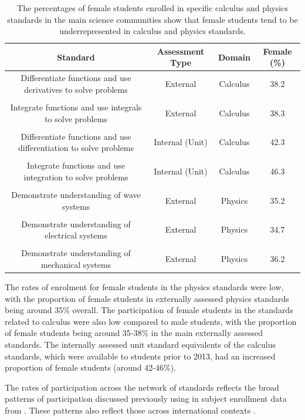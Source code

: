 \begin{table}[ht!]
\begin{tabular}{|c|c|c|c|}
\hline
Standard & Assessment Type & Domain   & Female (\%) \\ \hline
     Differentiate functions and use derivatives to solve problems & External & Calculus & 38.2\\
      & & & \\
     Integrate functions and use integrals to solve problems & External & Calculus & 38.3\\
      & & & \\
     Differentiate functions and use differentiation to solve problems & Internal (Unit) & Calculus  &    42.3   \\
     & & & \\
     Integrate functions and use integration to solve problems & Internal (Unit) & Calculus & 46.3\\
      & & & \\
      Demonstrate understanding of wave systems & External & Physics  &  35.2\\
      & & & \\
     Demonstrate understanding of electrical systems & External & Physics  & 34.7 \\
      & & & \\
      Demonstrate understanding of mechanical systems & External & Physics & 36.2 
      \\ \hline
\end{tabular}  \caption{The percentages of female students enrolled in specific calculus and physics standards in the main science communities show that female students tend to be underrepresented in calculus and physics standards.}  \label{table:StdattainmentGender}

\end{table}

The rates of enrolment for female students in the physics standards were low, with the proportion of female students in externally assessed physics standards being around 35\% overall. The participation of female students in the standards related to calculus were also low compared to male students, with the proportion of female students being around 35-38\% in the main externally assessed standards. The internally assessed unit standard equivalents of the calculus standards, which were available to students prior to 2013, had an increased proportion of female students (around 42-46\%). 

The rates of participation across the network of standards reflects the broad patterns of participation discussed previously using in subject enrollment data from \citet{EducationCounts_2018}. These patterns also reflect those across international contexts \citep{Else_Quest_2013, Sheldrake_2015, NSF, InstituteofPhysics_2013}. 


